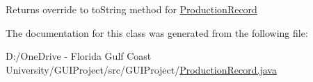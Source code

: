\begin{DoxyReturn}{Returns}
override to to\+String method for \mbox{\hyperlink{class_g_u_i_project_1_1_production_record}{Production\+Record}} 
\end{DoxyReturn}


The documentation for this class was generated from the following file\+:\begin{DoxyCompactItemize}
\item 
D\+:/\+One\+Drive -\/ Florida Gulf Coast University/\+G\+U\+I\+Project/src/\+G\+U\+I\+Project/\mbox{\hyperlink{_production_record_8java}{Production\+Record.\+java}}\end{DoxyCompactItemize}
